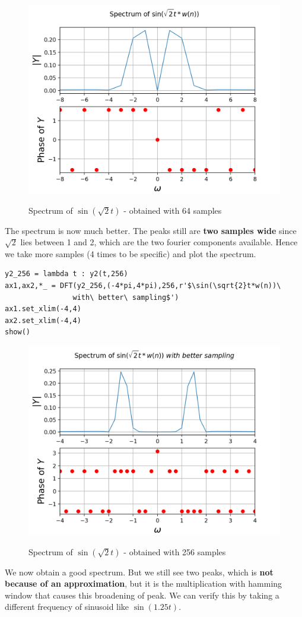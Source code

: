 \documentclass[11pt, a4paper]{article}
\begin{document}
\begin{figure}[H]
   	\centering
   	\includegraphics[scale=0.8]{ex_1_f.png}
   	\label{fig:ex_1_f}
   	\caption{Spectrum of $\sin(\sqrt{2} t)$ - obtained with 64 samples}
\end{figure}
{
The spectrum is now much better. The peaks still are \textbf{two samples wide} since $\sqrt{2}$ lies between 1 and 2, which are the two fourier components available. Hence we take more samples (4 times to be specific) and plot the spectrum.
}
\begin{verbatim}
y2_256 = lambda t : y2(t,256)
ax1,ax2,*_ = DFT(y2_256,(-4*pi,4*pi),256,r'$\sin(\sqrt{2}t*w(n))\ 
				with\ better\ sampling$')
ax1.set_xlim(-4,4)
ax2.set_xlim(-4,4)
show()
\end{verbatim}

\begin{figure}[H]
   	\centering
   	\includegraphics[scale=0.8]{ex_1_f4.png}
   	\label{fig:ex_1_f4}
   	\caption{Spectrum of $\sin(\sqrt{2} t)$ - obtained with 256 samples}
\end{figure}
{
We now obtain a good spectrum. But we still see two peaks, which is \textbf{not because of an approximation}, but it is the multiplication with hamming window that causes this broadening of peak. We can verify this by taking a different frequency of sinusoid like $\sin(1.25 t)$.
}
\end{document}
